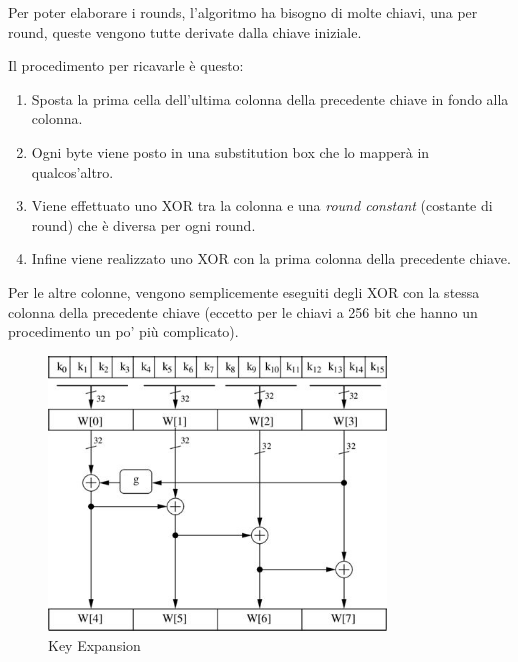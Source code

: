 \textsf{\small Per poter elaborare i rounds, l'algoritmo ha bisogno di molte chiavi, una per round, queste vengono tutte derivate dalla chiave iniziale.}


\textsf{\small Il procedimento per ricavarle è questo: }

 

\begin{enumerate}
	\item \textsf{\small Sposta la prima cella dell'ultima colonna della precedente chiave in fondo alla colonna.} %
	\item \textsf{\small Ogni byte viene posto in una substitution box che lo mapperà in qualcos'altro.} %
	\item \textsf{\small Viene effettuato uno XOR tra la colonna e una \emph{round constant} (costante di round) che è diversa per ogni round.} %
	\item \textsf{\small Infine viene realizzato uno XOR con la prima colonna della precedente chiave.}
\end{enumerate}


\textsf{\small Per le altre colonne, vengono semplicemente eseguiti degli XOR con la stessa colonna della precedente chiave (eccetto per le chiavi a 256 bit che hanno un procedimento un po' più complicato).} %

\begin{figure}[H]
	\centering
	\includegraphics[width=0.8\textwidth, height=0.8\textheight, keepaspectratio]{./images/key_expansion/key_expansion.png}
	\caption{Key Expansion}
	\label{fig:key_expansion}
\end{figure}

